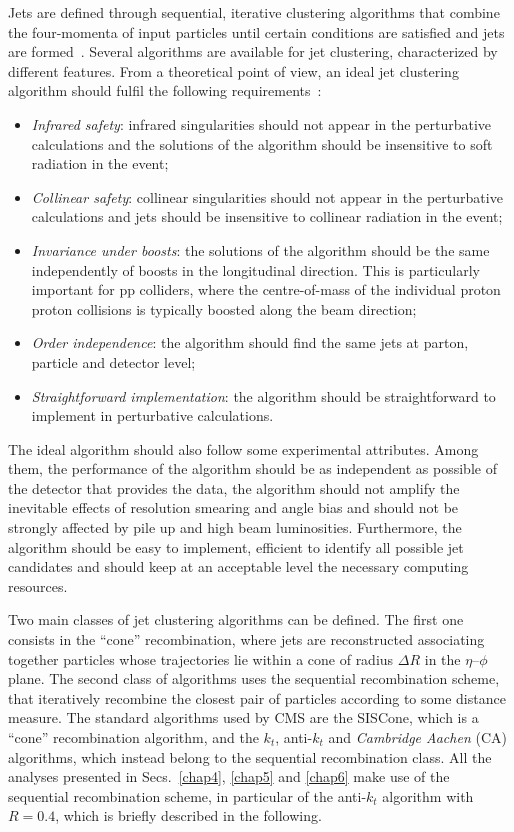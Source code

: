 Jets are defined through sequential, iterative clustering algorithms that combine the four-momenta of input particles until certain conditions are satisfied and jets are formed~\cite{Salam:2009jx}. Several algorithms are available for jet clustering, characterized by different features. From a theoretical point of view, an ideal jet clustering algorithm should fulfil the following requirements~\cite{Blazey:2000qt}:
\begin{itemize}
\item \emph{Infrared safety}: infrared singularities should not appear in the perturbative calculations and the solutions of the algorithm should be insensitive to soft radiation in the event;
\item \emph{Collinear safety}: collinear singularities should not appear in the perturbative calculations and jets should be insensitive to collinear radiation in the event;
\item \emph{Invariance under boosts}: the solutions of the algorithm should be the same independently of boosts in the longitudinal direction. This is particularly important for pp colliders, where the centre-of-mass of the individual proton proton collisions is typically boosted along the beam direction;
\item \emph{Order independence}: the algorithm should find the same jets at parton, particle and detector level;
\item \emph{Straightforward implementation}: the algorithm should be straightforward to implement in perturbative calculations.
\end{itemize}
The ideal algorithm should also follow some experimental attributes. Among them, the performance of the algorithm should be as independent as possible of the detector that provides the data, the algorithm should not amplify the inevitable effects of resolution smearing and angle bias and should not be strongly affected by pile up and high beam luminosities. Furthermore, the algorithm should be easy to implement, efficient to identify all possible jet candidates and should keep at an acceptable level the necessary computing resources.

Two main classes of jet clustering algorithms can be defined. The first one consists in the ``cone'' recombination, where jets are reconstructed associating together particles whose trajectories lie within a cone of radius $\Delta R$ in the $\eta$--$\phi$ plane. The second class of algorithms uses the sequential recombination scheme, that iteratively recombine the closest pair of particles according to some distance measure. The standard algorithms used by CMS are the SISCone, which is a ``cone'' recombination algorithm, and the $k_t$, anti-$k_t$ and \emph{Cambridge Aachen} (CA) algorithms, which instead belong to the sequential recombination class.
All the analyses presented in Secs.~\ref{chap4}, \ref{chap5} and \ref{chap6} make use of the sequential recombination scheme, in particular of the anti-$k_t$ algorithm with $R=0.4$, which is briefly described in the following.

